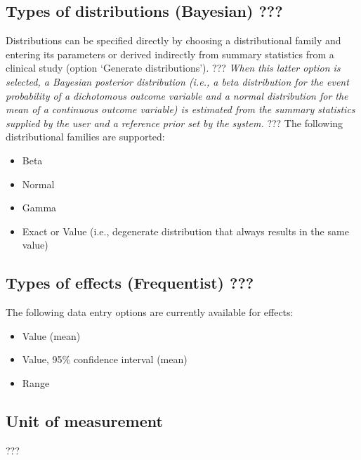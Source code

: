 \documentclass[00_mcda_tutorial.tex]{subfiles}
\begin{document}
\subsection*{Types of distributions (Bayesian) ???}
Distributions can be specified directly by choosing a distributional family and entering its parameters or derived indirectly from summary statistics from a clinical study (option ‘Generate distributions’). ??? \textit{When this latter option is selected, a Bayesian posterior distribution (i.e., a beta distribution for the event probability of a dichotomous outcome variable and a normal distribution for the mean of a continuous outcome variable) is estimated from the summary statistics supplied by the user and a reference prior set by the system.} ???
The following distributional families are supported:
\begin{itemize}
\item Beta
\item Normal
\item Gamma
\item Exact or Value (i.e., degenerate distribution that always results in the same value)
\end{itemize}
    
\subsection*{Types of effects (Frequentist) ???}
The following data entry options are currently available for effects:
\begin{itemize}
\item Value (mean)
\item Value, 95\% confidence interval (mean)
\item Range
\end{itemize}
 
\subsection*{Unit of measurement}
???
\end{document}

